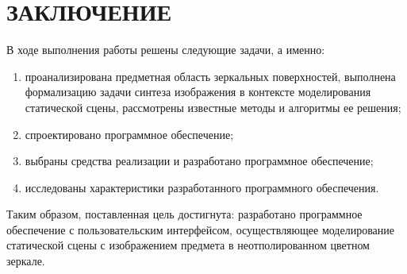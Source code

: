 \chapter*{ЗАКЛЮЧЕНИЕ}

В ходе выполнения работы решены следующие задачи, а именно:

\begin{enumerate}
	\item проанализирована предметная область зеркальных поверхностей, выполнена формализацию задачи синтеза изображения в контексте моделирования статической сцены, рассмотрены известные методы и алгоритмы ее решения;
	\item спроектировано программное обеспечение;
	\item выбраны средства реализации и разработано программное обеспечение;
	\item исследованы характеристики разработанного программного обеспечения.
\end{enumerate}

Таким образом, поставленная цель достигнута: разработано программное обеспечение с пользовательским интерфейсом, осуществляющее моделирование статической сцены с изображением предмета в неотполированном цветном зеркале.


